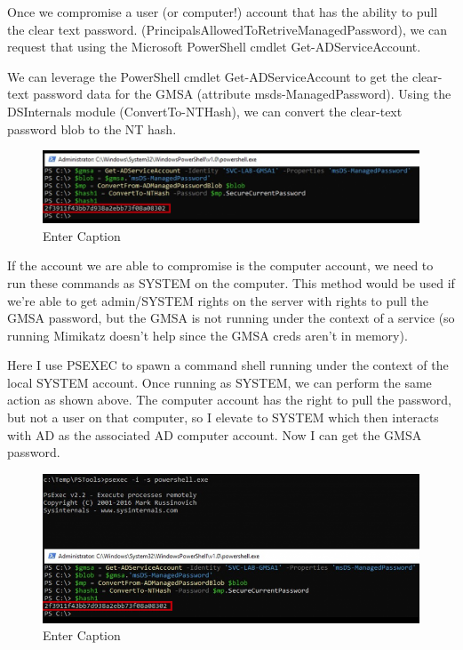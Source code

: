Once we compromise a user (or computer!) account that has the ability to pull the clear text password. (PrincipalsAllowedToRetriveManagedPassword), we can request that using the Microsoft PowerShell cmdlet Get-ADServiceAccount.

We can leverage the PowerShell cmdlet Get-ADServiceAccount to get the clear-text password data for the GMSA (attribute msds-ManagedPassword). Using the DSInternals module (ConvertTo-NTHash), we can convert the clear-text password blob to the NT hash.

\begin{figure}
    \centering
    \includegraphics[width=0.75\linewidth]{nthash.png}
    \caption{Enter Caption}
    \label{fig:placeholder}
\end{figure}

If the account we are able to compromise is the computer account, we need to run these commands as SYSTEM on the computer. This method would be used if we’re able to get admin/SYSTEM rights on the server with rights to pull the GMSA password, but the GMSA is not running under the context of a service (so running Mimikatz doesn’t help since the GMSA creds aren’t in memory).

Here I use PSEXEC to spawn a command shell running under the context of the local SYSTEM account. Once running as SYSTEM, we can perform the same action as shown above. The computer account has the right to pull the password, but not a user on that computer, so I elevate to SYSTEM which then interacts with AD as the associated AD computer account. Now I can get the GMSA password.
\begin{figure}
    \centering
    \includegraphics[width=0.75\linewidth]{gsmapass.png}
    \caption{Enter Caption}
    \label{fig:placeholder}
\end{figure}

